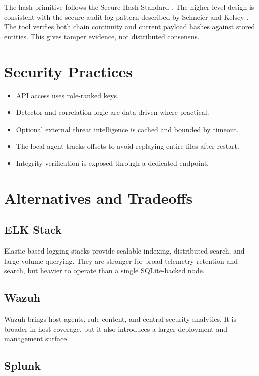 \documentclass[11pt,a4paper]{article}
\begin{document}
The hash primitive follows the Secure Hash Standard \citep{fips1804}. The higher-level design is consistent with the secure-audit-log pattern described by Schneier and Kelsey \citep{schneier1999}. The tool verifies both chain continuity and current payload hashes against stored entities. This gives tamper evidence, not distributed consensus.

\section{Security Practices}

\begin{itemize}[leftmargin=1.5em]
  \item API access uses role-ranked keys.
  \item Detector and correlation logic are data-driven where practical.
  \item Optional external threat intelligence is cached and bounded by timeout.
  \item The local agent tracks offsets to avoid replaying entire files after restart.
  \item Integrity verification is exposed through a dedicated endpoint.
\end{itemize}

\section{Alternatives and Tradeoffs}

\subsection{ELK Stack}

Elastic-based logging stacks provide scalable indexing, distributed search, and large-volume querying. They are stronger for broad telemetry retention and search, but heavier to operate than a single SQLite-backed node.

\subsection{Wazuh}

Wazuh brings host agents, rule content, and central security analytics. It is broader in host coverage, but it also introduces a larger deployment and management surface.

\subsection{Splunk}
\end{document}

